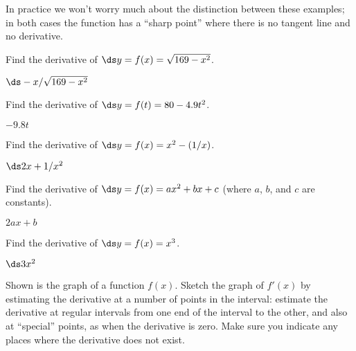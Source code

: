 In practice we won't worry much about the distinction between these
examples; in both cases the function has a ``sharp point'' where there
is no tangent line and no derivative.

\begin{exercises}

\begin{exercise}
Find the derivative of $\ds y=f(x)=\sqrt{169-x^2}$.
\begin{answer} $\ds -x/\sqrt{169-x^2}$
\end{answer}\end{exercise}

\begin{exercise}
Find the derivative of $\ds y=f(t)=80-4.9t^2$.
\begin{answer} $-9.8t$
\end{answer}\end{exercise}

\begin{exercise}
Find the derivative of $\ds y=f(x)=x^2-(1/x)$.
\begin{answer} $\ds 2x+1/x^2$
\end{answer}\end{exercise}

\begin{exercise}
Find the derivative of $\ds y=f(x)=
ax^2+bx+c$ (where $a$, $b$, and $c$ are constants).
\begin{answer} $2ax+b$
\end{answer}\end{exercise}

\begin{exercise}
Find the derivative of $\ds y=f(x)=x^3$.
\begin{answer} $\ds 3x^2$
\end{answer}\end{exercise}

\begin{exercise}
Shown is the graph of a function $f(x)$. Sketch the graph of $f'(x)$
by estimating the derivative at a number of points in the interval:
estimate the derivative at regular intervals from one end of the
interval to the other, and also at ``special'' points, as when the
derivative is zero. Make sure you indicate any places where the
derivative does not exist.
\end{exercise}


\end{exercises}
